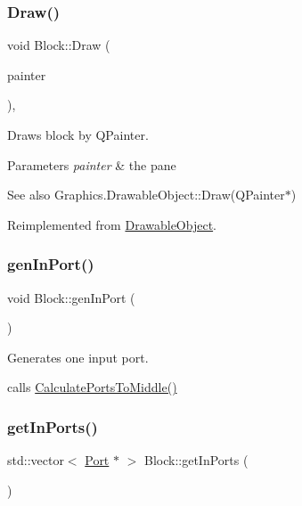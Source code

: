 \subsubsection{\texorpdfstring{Draw()}{Draw()}}
{\footnotesize\ttfamily void Block\+::\+Draw (\begin{DoxyParamCaption}\item[{Q\+Painter $\ast$}]{painter }\end{DoxyParamCaption})\hspace{0.3cm}{\ttfamily [override]}, {\ttfamily [virtual]}}

Draws block by Q\+Painter. 
\begin{DoxyParams}{Parameters}
{\em painter} & the pane \\
\hline
\end{DoxyParams}
\begin{DoxySeeAlso}{See also}
Graphics.\+Drawable\+Object\+::\+Draw(\+Q\+Painter$\ast$) 
\end{DoxySeeAlso}


Reimplemented from \hyperlink{classDrawableObject}{Drawable\+Object}.

\mbox{\label{classBlock_a1a02b48229dc2df1d58b1c7a202f3e5e}} 
\subsubsection{\texorpdfstring{gen\+In\+Port()}{genInPort()}}
{\footnotesize\ttfamily void Block\+::gen\+In\+Port (\begin{DoxyParamCaption}{ }\end{DoxyParamCaption})}

Generates one input port.

calls \hyperlink{}{Calculate\+Ports\+To\+Middle()} \mbox{\label{classBlock_af10d358559032e920b7b8ad25c113b69}} 
\subsubsection{\texorpdfstring{get\+In\+Ports()}{getInPorts()}}
{\footnotesize\ttfamily std\+::vector$<$ \hyperlink{classPort}{Port} $\ast$ $>$ Block\+::get\+In\+Ports (\begin{DoxyParamCaption}{ }\end{DoxyParamCaption})}

